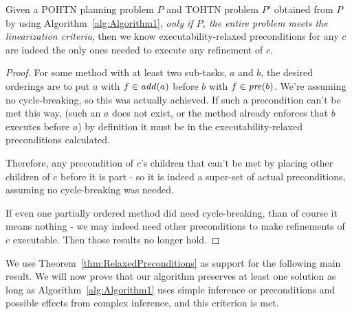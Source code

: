 \begin{theorem} \label{thm:RelaxedPreconditions}
	Given a POHTN planning problem $P$ and TOHTN problem $P'$ obtained from $P$ by using Algorithm~\ref{alg:Algorithm1}, \emph{only if $P$, the entire problem meets the linearization criteria},
	then we know executability-relaxed preconditions for any $c$ are indeed the only ones needed to execute any refinement of $c$.
\end{theorem}
\begin{proof}

	For some method with at least two sub-tasks, $a$ and $b$,
	the desired orderings are to put $a$ with $f \in \mathit{add}(a)$ before $b$ with $f \in \mathit{pre}(b)$. We're assuming no cycle-breaking, so this was actually achieved. If such a precondition can't be met this way, (such an $a$ does not exist, or the method already enforces that $b$ executes before $a$) by definition it must be in the executability-relaxed preconditions calculated.

	Therefore, any precondition of $c$'s children that can't be met by placing other children of $c$ before it is part - so it is indeed a super-set of actual preconditions, assuming no cycle-breaking was needed.

	If even one partially ordered method did need cycle-breaking, than of course it means nothing - we may indeed need other preconditions to make refinements of $c$ executable. Then those results no longer hold.
\end{proof}

We use Theorem~\ref{thm:RelaxedPreconditions} as support for the following main result. We will now prove that our algorithm preserves at least one solution as long as Algorithm~\ref{alg:Algorithm1} uses simple inference or preconditions and possible effects from complex inference, and this criterion is met.

